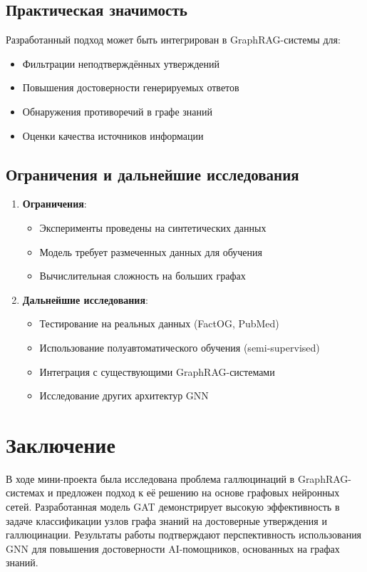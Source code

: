 \documentclass[12pt,a4paper]{article}
\begin{document}
\subsection{Практическая значимость}
Разработанный подход может быть интегрирован в GraphRAG-системы для:
\begin{itemize}
    \item Фильтрации неподтверждённых утверждений
    \item Повышения достоверности генерируемых ответов
    \item Обнаружения противоречий в графе знаний
    \item Оценки качества источников информации
\end{itemize}

\subsection{Ограничения и дальнейшие исследования}
\begin{enumerate}
    \item \textbf{Ограничения}:
    \begin{itemize}
        \item Эксперименты проведены на синтетических данных
        \item Модель требует размеченных данных для обучения
        \item Вычислительная сложность на больших графах
    \end{itemize}
    
    \item \textbf{Дальнейшие исследования}:
    \begin{itemize}
        \item Тестирование на реальных данных (FactOG, PubMed)
        \item Использование полуавтоматического обучения (semi-supervised)
        \item Интеграция с существующими GraphRAG-системами
        \item Исследование других архитектур GNN
    \end{itemize}
\end{enumerate}

\section*{Заключение}
В ходе мини-проекта была исследована проблема галлюцинаций в GraphRAG-системах и предложен подход к её решению на основе графовых нейронных сетей. Разработанная модель GAT демонстрирует высокую эффективность в задаче классификации узлов графа знаний на достоверные утверждения и галлюцинации. Результаты работы подтверждают перспективность использования GNN для повышения достоверности AI-помощников, основанных на графах знаний.
\end{document}
